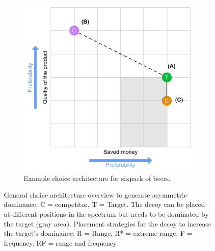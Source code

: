 \begin{figure}[t]
\begin{subfigure}[t]{0.49\textwidth}
	\end{subfigure}
	\begin{subfigure}[t]{0.49\textwidth}
		\includegraphics[width=\textwidth]{figures/decoy/decoy-dimensions-beer}
		\caption{Example choice architecture for sixpack of beers.}
		\label{fig:decoy:beer-construction} 
	\end{subfigure}
	\caption{
		General choice architecture overview to generate asymmetric dominance. 
		C = competitor, T = Target. The decoy can be placed at different positions in the spectrum but needs to be dominated by the target (gray area). Placement strategies for the decoy to increase the target's dominance: R = Range, R* = extreme range, F = frequency, RF = range and frequency.
	} 
\end{figure}


